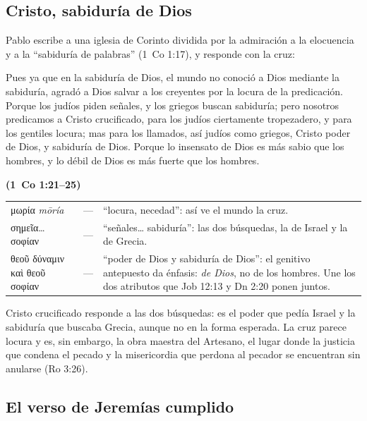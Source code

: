 \documentclass[11pt,letterpaper]{article}
\newcommand{\grc}[1]{\foreignlanguage{ancientgreek}{#1}}
\newcommand{\fuente}[1]{\par\hfill{\upshape\bfseries\small\textcolor{azul}{#1}}}
\begin{document}
\subsection{Cristo, sabiduría de Dios}

Pablo escribe a una iglesia de Corinto dividida por la admiración a la elocuencia y a la ``sabiduría de palabras'' (1~Co 1:17), y responde con la cruz:

\begin{cita}Pues ya que en la sabiduría de Dios, el mundo no conoció a Dios mediante la sabiduría, agradó a Dios salvar a los creyentes por la locura de la predicación. Porque los judíos piden señales, y los griegos buscan sabiduría; pero nosotros predicamos a Cristo crucificado, para los judíos ciertamente tropezadero, y para los gentiles locura; mas para los llamados, así judíos como griegos, Cristo poder de Dios, y sabiduría de Dios. Porque lo insensato de Dios es más sabio que los hombres, y lo débil de Dios es más fuerte que los hombres.\fuente{(1~Co 1:21--25)}\end{cita}

\begin{filologia}[1~Co 1:21--25]
\begin{tabular}{@{}L{3.2cm}L{1.6cm}L{10cm}@{}}
\grc{μωρία} \emph{mōría} & --- & ``locura, necedad'': así ve el mundo la cruz. \\[2pt]
\grc{σημεῖα\ldots{} σοφίαν} & --- & ``señales\ldots{} sabiduría'': las dos búsquedas, la de Israel y la de Grecia. \\[2pt]
\grc{θεοῦ δύναμιν καὶ θεοῦ σοφίαν} & --- & ``poder de Dios y sabiduría de Dios'': el genitivo antepuesto da énfasis: \emph{de Dios}, no de los hombres. Une los dos atributos que Job 12:13 y Dn 2:20 ponen juntos. \\
\end{tabular}
\end{filologia}

Cristo crucificado responde a las dos búsquedas: es el poder que pedía Israel y la sabiduría que buscaba Grecia, aunque no en la forma esperada. La cruz parece locura y es, sin embargo, la obra maestra del Artesano, el lugar donde la justicia que condena el pecado y la misericordia que perdona al pecador se encuentran sin anularse (Ro 3:26).

\subsection{El verso de Jeremías cumplido}
\end{document}
